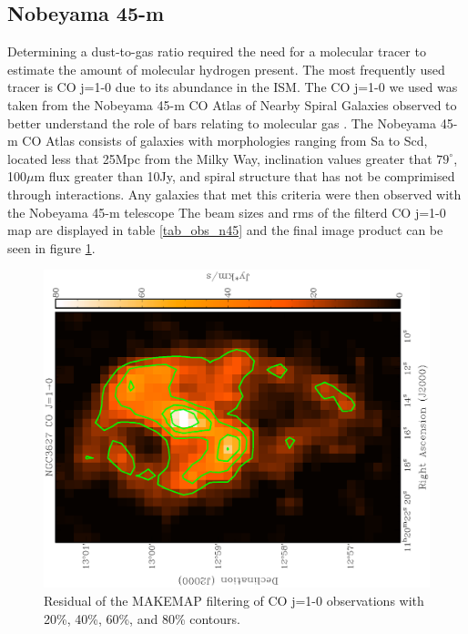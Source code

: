 
\subsection{Nobeyama 45-m}\label{nob_sec}

Determining a dust-to-gas ratio required the need for a molecular tracer to estimate the amount of molecular hydrogen present.  The most frequently used tracer is CO j=1-0 due to its abundance in the ISM.  The CO j=1-0 we used was taken from the Nobeyama 45-m CO Atlas of Nearby Spiral Galaxies observed to better understand the role of bars relating to molecular gas \citep{kuno2007}.  The Nobeyama 45-m CO Atlas consists of galaxies with morphologies ranging from Sa to Scd, located less that 25Mpc from the Milky Way, inclination values greater that $79^{\circ}$, 100$\mu$m flux greater than 10Jy, and spiral structure that has not be comprimised through interactions.  Any galaxies that met this criteria were then observed with the Nobeyama 45-m telescope \citep{kuno2007}  The beam sizes and rms of the filterd CO j=1-0 map are displayed in table \ref{tab_obs_n45} and the final image product can be seen in figure \ref{fig_co10}.

\begin{figure}
  \centering
  \label{fig_co10}
  \includegraphics[width=1.\textwidth, angle=270]{obs_imgs/CO10.eps}
  \caption[NGC3627 CO j=1-0 Observations]{Residual of the MAKEMAP filtering of CO j=1-0 observations with 20\%, 40\%, 60\%, and 80\% contours.}
\end{figure}

